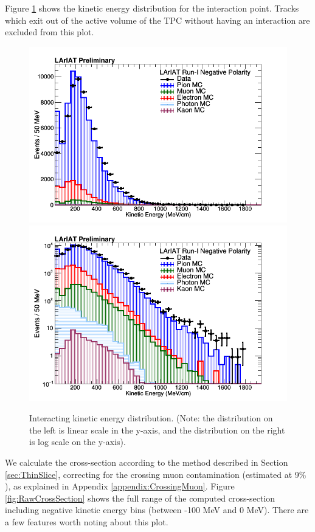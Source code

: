 Figure \ref{fig:InteractingEnergy} shows the kinetic energy distribution for the interaction point. Tracks which exit out of the active volume of the TPC without having an interaction are excluded from this plot.

\begin{figure}[h!]
\centering
\includegraphics[scale=0.30]{./images/InteractingKE.png}
\includegraphics[scale=0.30]{./images/InteractingKELog.png}
\caption{Interacting kinetic energy distribution. (Note: the distribution on the left is linear scale in the y-axis, and the distribution on the right is log scale on the y-axis).}
\label{fig:InteractingEnergy}
\end{figure}

We calculate the cross-section according to the method described in Section \ref{sec:ThinSlice}, correcting for the crossing muon contamination (estimated at 9$\%$), as explained in Appendix \ref{appendix:CrossingMuon}. Figure \ref{fig:RawCrossSection} shows the full range of the computed cross-section including negative kinetic energy bins (between -100 MeV and 0 MeV). There are a few features worth noting about this plot.

